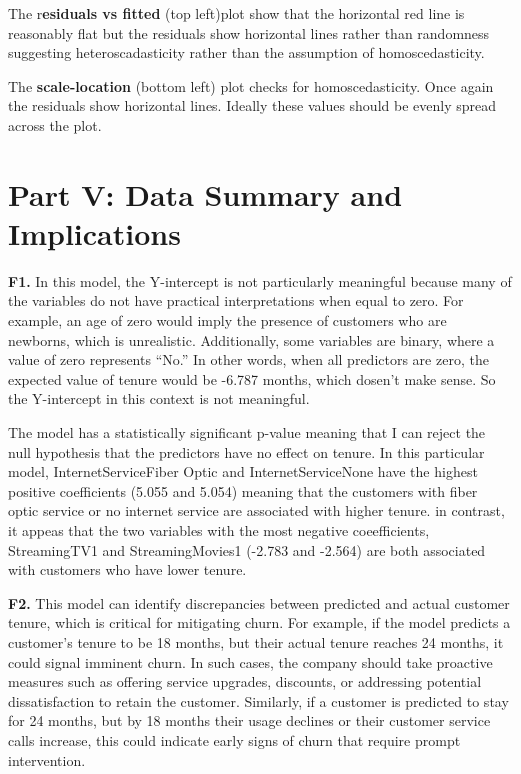 \documentclass[
]{article}
\begin{document}
The r\textbf{esiduals vs fitted} (top left)plot show that the horizontal
red line is reasonably flat but the residuals show horizontal lines
rather than randomness suggesting heteroscadasticity rather than the
assumption of homoscedasticity.

The \textbf{scale-location} (bottom left) plot checks for
homoscedasticity. Once again the residuals show horizontal lines.
Ideally these values should be evenly spread across the plot.

\section{Part V: Data Summary and
Implications}\label{part-v-data-summary-and-implications}

\textbf{F1.} In this model, the Y-intercept is not particularly
meaningful because many of the variables do not have practical
interpretations when equal to zero. For example, an age of zero would
imply the presence of customers who are newborns, which is unrealistic.
Additionally, some variables are binary, where a value of zero
represents ``No.'' In other words, when all predictors are zero, the
expected value of tenure would be -6.787 months, which dosen't make
sense. So the Y-intercept in this context is not meaningful.

The model has a statistically significant p-value meaning that I can
reject the null hypothesis that the predictors have no effect on tenure.
In this particular model, InternetServiceFiber Optic and
InternetServiceNone have the highest positive coefficients (5.055 and
5.054) meaning that the customers with fiber optic service or no
internet service are associated with higher tenure. in contrast, it
appeas that the two variables with the most negative coeefficients,
StreamingTV1 and StreamingMovies1 (-2.783 and -2.564) are both
associated with customers who have lower tenure.

\textbf{F2.} This model can identify discrepancies between predicted and
actual customer tenure, which is critical for mitigating churn. For
example, if the model predicts a customer's tenure to be 18 months, but
their actual tenure reaches 24 months, it could signal imminent churn.
In such cases, the company should take proactive measures such as
offering service upgrades, discounts, or addressing potential
dissatisfaction to retain the customer. Similarly, if a customer is
predicted to stay for 24 months, but by 18 months their usage declines
or their customer service calls increase, this could indicate early
signs of churn that require prompt intervention.
\end{document}
